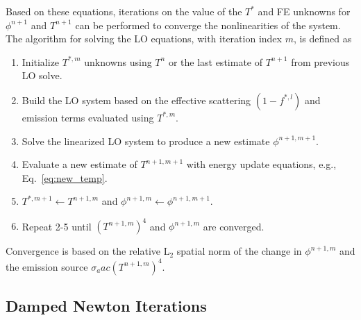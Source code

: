 Based on these equations, iterations on the value of the $T^*$ and FE unknowns for $\phi^{n+1}$ and $T^{n+1}$ can be performed to converge the nonlinearities of the system. The algorithm for solving the LO equations, with iteration index
$m$, is defined as
\begin{enumerate}
    \item Initialize $T^{*,m}$ unknowns using $T^n$ or the last estimate of $T^{n+1}$ from
        previous LO solve.
    \item  Build the LO system based on the effective scattering $(1-f^{*,l})$ and emission terms
        evaluated using $T^{*,m}$.
    \item Solve the linearized LO system to produce a new estimate $\phi^{n+1,m+1}$.
    \item Evaluate a new estimate of $T^{n+1,m+1}$ with energy update equations, e.g., Eq.~\eqref{eq:new_temp}.
       \item $T^{*,m+1}\leftarrow{T}^{n+1,m}$ and $\phi^{n+1,m} \leftarrow
           \phi^{n+1,m+1}$.
    \item Repeat 2-5 until $(T^{n+1,m})^4$ and $\phi^{n+1,m}$ are converged.
\end{enumerate}
Convergence is based on the relative L$_2$ spatial norm of the change in $\phi^{n+1,m}$
and the emission source $\sigma_a a c \left(T^{n+1,m}\right)^4$.

\subsection{Damped Newton Iterations}
\label{app:damped_newton}

